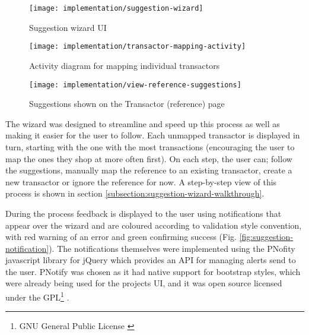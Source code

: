 \begin{figure}[h]
    \centering
    \texttt{[image: implementation/suggestion-wizard]}
    \caption[Suggestion wizard UI]{Suggestion wizard UI}
    \label{fig:suggestion-wizard}
\end{figure}

\begin{figure}[h]
    \centering
    \texttt{[image: implementation/transactor-mapping-activity]}
    \caption{Activity diagram for mapping individual transactors}
    \label{fig:transactor-mapping-activity}
    
    \begin{comment}
(start)->(Open Statement)->(Search Statement)-><a>->(end)
<a>->(Open Transactor)->(Map Transactor)->(Open Statement)
    \end{comment}
\end{figure}

\begin{figure}[h]
    \centering
    \texttt{[image: implementation/view-reference-suggestions]}
    \caption{Suggestions shown on the Transactor (reference) page}
    \label{fig:view-reference-suggestions}
\end{figure}

The wizard was designed to streamline and speed up this process as well as making it easier for the user to follow. Each unmapped transactor is displayed in turn, starting with the one with the most transactions (encouraging the user to map the ones they shop at more often first). On each step, the user can; follow the suggestions, manually map the reference to an existing transactor, create a new transactor or ignore the reference for now. A step-by-step view of this process is shown in section \ref{subsection:suggestion-wizard-walkthrough}.

During the process feedback is displayed to the user using notifications that appear over the wizard and are coloured according to validation style convention, with red warning of an error and green confirming success (Fig. \ref{fig:suggestion-notification}). 
%
The notifications themselves were implemented using the PNofity javascript library for jQuery which provides an API for managing alerts send to the user. PNotify was chosen as it had native support for bootstrap styles, which were already being used for the projects UI, and it was open source licensed under the GPL\footnote{GNU General Public License \parencite{gnu2007license}} \parencite{huber2014potify}.

